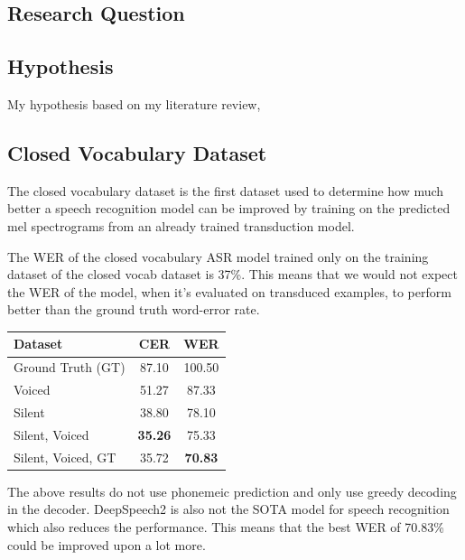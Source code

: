 \subsection{Research Question}

\subsection{Hypothesis}

My hypothesis based on my literature review, 

\subsection{Closed Vocabulary Dataset}

The closed vocabulary dataset is the first dataset used to determine how much better
a speech recognition model can be improved by training on the predicted mel spectrograms
from an already trained transduction model.

The WER of the closed vocabulary ASR model trained only on the training dataset
of the closed vocab dataset is 37\%. This means that we would not expect the WER
of the model, when it's evaluated on transduced examples, to perform better than
the ground truth word-error rate.

{\small\begin{center}
\begin{tabular} {  l  c  c  }
\hline
\textbf{Dataset} & \textbf{CER} & \textbf{WER} \\
\hline
Ground Truth (GT) & 87.10 & 100.50 \\
Voiced & 51.27 & 87.33 \\
Silent & 38.80 & 78.10 \\
Silent, Voiced & \textbf{35.26} & 75.33 \\
\hline
Silent, Voiced, GT & 35.72 & \textbf{70.83} \\
\hline
\end{tabular}
\end{center}}

The above results do not use phonemeic prediction and only use greedy decoding
in the decoder. DeepSpeech2 is also not the SOTA model for speech recognition
which also reduces the performance. This means that the best WER of 70.83\% could
be improved upon a lot more.

